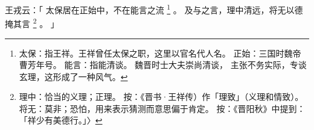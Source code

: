 
\switchcolumn*[\section{}]

王戎云：「
    太保居在正始中，不在能言之流%
    \footnote{%
        太保：指王祥。王祥曾任太保之职，这里以官名代人名。
        正始：三国时魏帝曹芳年号。
        能言：指能清谈。
              魏晋时士大夫崇尚清谈，
              主张不务实际，专谈玄理，这形成了一种风气。
    }%
    。
    及与之言，理中清远，将无以德掩其言%
    \footnote{%
        理中：恰当的义理；正理。
        按：《晋书·王祥传）作「理致」（义理和情致）。
        将无：莫非；恐怕，用来表示猜测而意思偏于肯定。
        按：《晋阳秋》中提到：「祥少有美德行。」〉
    }%
    。
」

\switchcolumn


